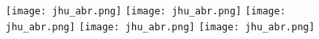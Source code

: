 \documentclass[a4paper]{article}
\begin{document}
\begin{figure}
\texttt{[image: jhu\_abr.png]}
\texttt{[image: jhu\_abr.png]}
\texttt{[image: jhu\_abr.png]}
\texttt{[image: jhu\_abr.png]}
\texttt{[image: jhu\_abr.png]}
\end{figure}
\end{document}
